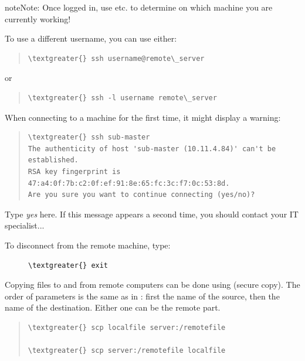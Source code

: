 \documentclass[letterpaper,10pt,english]{sphinxmanual}
\begin{document}
\begin{notice}{note}{Note:}
Once logged in, use   etc. to determine on which machine you are currently working!
\end{notice}

To use a different username, you can use either:
\begin{quote}

\begin{Verbatim}[commandchars=\\\{\}]
\textgreater{} ssh username@remote\_server
\end{Verbatim}
\end{quote}

or
\begin{quote}

\begin{Verbatim}[commandchars=\\\{\}]
\textgreater{} ssh -l username remote\_server
\end{Verbatim}
\end{quote}

When connecting to a machine for the first time, it might display a warning:
\begin{quote}

\begin{Verbatim}[commandchars=\\\{\}]
\textgreater{} ssh sub-master
The authenticity of host 'sub-master (10.11.4.84)' can't be established.
RSA key fingerprint is 47:a4:0f:7b:c2:0f:ef:91:8e:65:fc:3c:f7:0c:53:8d.
Are you sure you want to continue connecting (yes/no)?
\end{Verbatim}
\end{quote}

Type \emph{yes} here.
If this message appears a second time, you should contact your IT specialist...
\begin{description}
\item[{To disconnect from the remote machine, type:}] \leavevmode
\begin{Verbatim}[commandchars=\\\{\}]
\textgreater{} exit
\end{Verbatim}

\end{description}

Copying files to and from remote computers can be done using   (secure copy).
The order of parameters is the same as in : first the name of the source, then the name of the destination. Either one can be the remote part.
\begin{quote}

\begin{Verbatim}[commandchars=\\\{\}]
\textgreater{} scp localfile server:/remotefile

\textgreater{} scp server:/remotefile localfile
\end{Verbatim}
\end{quote}
\end{document}
